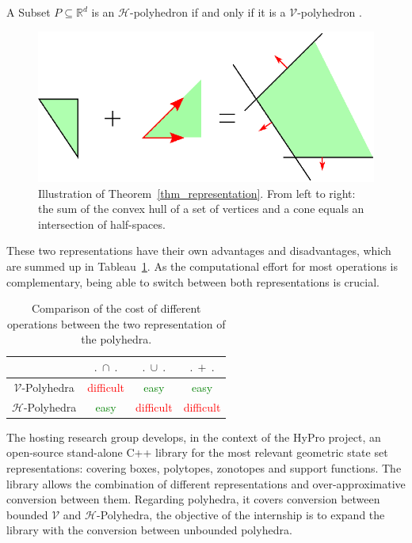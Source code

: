 \begin{theorem}
A Subset $P\subseteq\mathbb{R}^d$ is an $\mathcal{H}$-polyhedron if and only if it is a $\mathcal{V}$-polyhedron \cite{ziegler_polytopes}.
\label{thm_representation}
\end{theorem} 

\begin{figure}
\includegraphics[scale=1]{images/poly.eps}
\caption{Illustration of Theorem~\ref{thm_representation}. From left to right: the sum of the convex hull of a set of vertices and a cone equals an intersection of half-spaces.}
\end{figure}

These two representations have their own advantages and disadvantages, which are summed up  in Tableau~\ref{comparison tab}. As the computational effort for most operations is complementary, being able to switch between both representations is crucial.

\begin{table}
\begin{tabular}{| c | c | c | c |}
	\hline	
				    & $.\ \cap\ .$ & $.\ \cup\ .$ & $.\ +\ .$ \\ \hline
	$\mathcal{V}$-Polyhedra   & \textcolor{red}{difficult} & \textcolor{green}{easy} & \textcolor{green}{easy} \\ \hline
   	$\mathcal{H}$-Polyhedra   & \textcolor{green}{easy} & \textcolor{red}{difficult} & \textcolor{red}{difficult}\\ \hline
\end{tabular}
\caption{Comparison of the cost of different operations between the two representation of the polyhedra.}
\label{comparison tab}
\end{table}

The hosting research group develops, in the context of the HyPro project, an open-source stand-alone C++ library for the most relevant geometric state set representations: covering boxes, polytopes, zonotopes and support functions. 
The library allows the combination of different representations and over-approximative conversion between them. Regarding polyhedra, it covers conversion between bounded $\mathcal{V}$ and $\mathcal{H}$-Polyhedra, the objective of the internship is to expand the library with the conversion between unbounded polyhedra.

